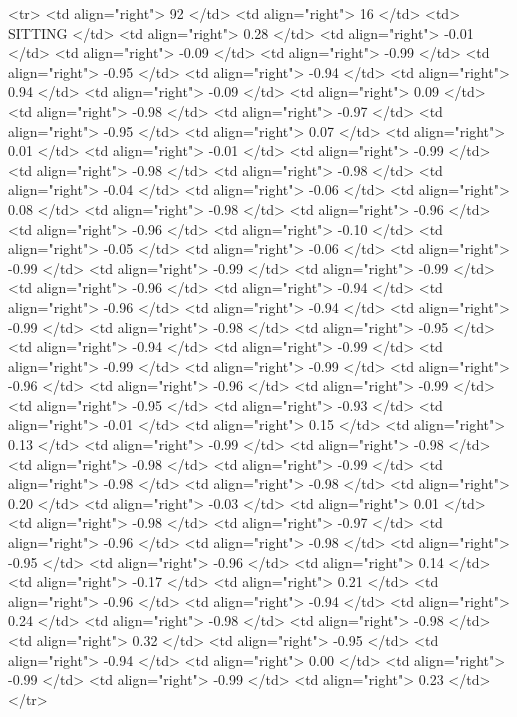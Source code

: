   <tr> <td align="right"> 92 </td> <td align="right">  16 </td> <td> SITTING </td> <td align="right"> 0.28 </td> <td align="right"> -0.01 </td> <td align="right"> -0.09 </td> <td align="right"> -0.99 </td> <td align="right"> -0.95 </td> <td align="right"> -0.94 </td> <td align="right"> 0.94 </td> <td align="right"> -0.09 </td> <td align="right"> 0.09 </td> <td align="right"> -0.98 </td> <td align="right"> -0.97 </td> <td align="right"> -0.95 </td> <td align="right"> 0.07 </td> <td align="right"> 0.01 </td> <td align="right"> -0.01 </td> <td align="right"> -0.99 </td> <td align="right"> -0.98 </td> <td align="right"> -0.98 </td> <td align="right"> -0.04 </td> <td align="right"> -0.06 </td> <td align="right"> 0.08 </td> <td align="right"> -0.98 </td> <td align="right"> -0.96 </td> <td align="right"> -0.96 </td> <td align="right"> -0.10 </td> <td align="right"> -0.05 </td> <td align="right"> -0.06 </td> <td align="right"> -0.99 </td> <td align="right"> -0.99 </td> <td align="right"> -0.99 </td> <td align="right"> -0.96 </td> <td align="right"> -0.94 </td> <td align="right"> -0.96 </td> <td align="right"> -0.94 </td> <td align="right"> -0.99 </td> <td align="right"> -0.98 </td> <td align="right"> -0.95 </td> <td align="right"> -0.94 </td> <td align="right"> -0.99 </td> <td align="right"> -0.99 </td> <td align="right"> -0.99 </td> <td align="right"> -0.96 </td> <td align="right"> -0.96 </td> <td align="right"> -0.99 </td> <td align="right"> -0.95 </td> <td align="right"> -0.93 </td> <td align="right"> -0.01 </td> <td align="right"> 0.15 </td> <td align="right"> 0.13 </td> <td align="right"> -0.99 </td> <td align="right"> -0.98 </td> <td align="right"> -0.98 </td> <td align="right"> -0.99 </td> <td align="right"> -0.98 </td> <td align="right"> -0.98 </td> <td align="right"> 0.20 </td> <td align="right"> -0.03 </td> <td align="right"> 0.01 </td> <td align="right"> -0.98 </td> <td align="right"> -0.97 </td> <td align="right"> -0.96 </td> <td align="right"> -0.98 </td> <td align="right"> -0.95 </td> <td align="right"> -0.96 </td> <td align="right"> 0.14 </td> <td align="right"> -0.17 </td> <td align="right"> 0.21 </td> <td align="right"> -0.96 </td> <td align="right"> -0.94 </td> <td align="right"> 0.24 </td> <td align="right"> -0.98 </td> <td align="right"> -0.98 </td> <td align="right"> 0.32 </td> <td align="right"> -0.95 </td> <td align="right"> -0.94 </td> <td align="right"> 0.00 </td> <td align="right"> -0.99 </td> <td align="right"> -0.99 </td> <td align="right"> 0.23 </td> </tr>
